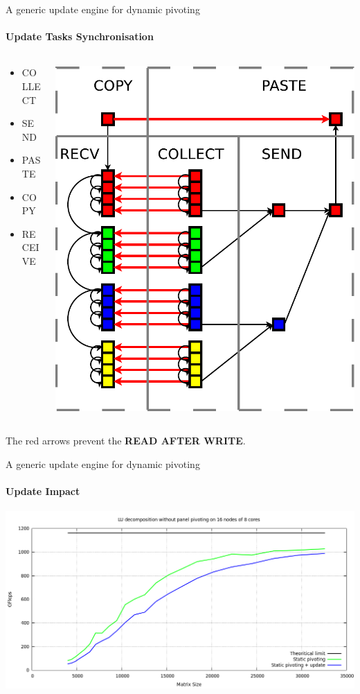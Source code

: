 \begin{frame}{A generic update engine for dynamic pivoting}
\framesubtitle{Update Tasks Synchronisation}
\begin{columns}
\begin{column}{.60\textwidth}
\begin{itemize}
\item COLLECT
\item SEND
\item PASTE
\item COPY
\item RECEIVE
\end{itemize}
\end{column}
\hfill
\begin{column}{.40\textwidth}
\begin{center}
\includegraphics[scale=0.3]{swap_opt.pdf}
\end{center}
\end{column}
\end{columns}
The red arrows prevent the \alert{\textbf{READ AFTER WRITE}}.
\end{frame}

\begin{frame}{A generic update engine for dynamic pivoting}
\framesubtitle{Update Impact}
\begin{center}
\includegraphics[width=1\textwidth]{dgetrf_update_problem.png} 
\end{center}
\end{frame}
